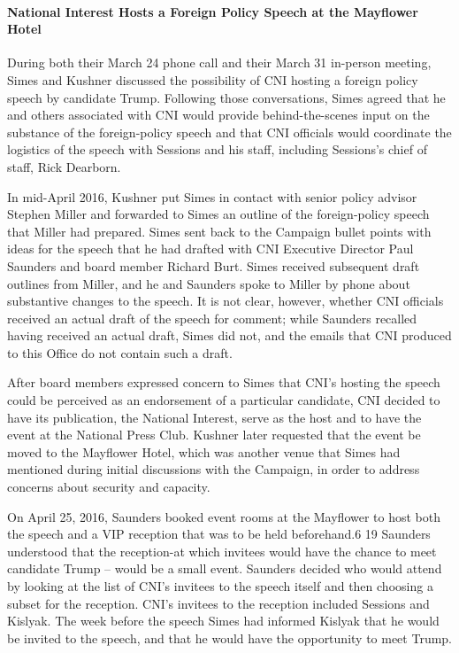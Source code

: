 \paragraph{National Interest Hosts a Foreign Policy Speech at the Mayflower Hotel}

During both their March 24 phone call and their March 31 in-person meeting, Simes and Kushner discussed the possibility of CNI hosting a foreign policy speech by candidate Trump.%
Following those conversations, Simes agreed that he and others associated with CNI would provide behind-the-scenes input on the substance of the foreign-policy speech and that CNI officials would coordinate the logistics of the speech with Sessions and his staff, including Sessions's chief of staff, Rick Dearborn.%

In mid-April 2016, Kushner put Simes in contact with senior policy advisor Stephen Miller and forwarded to Simes an outline of the foreign-policy speech that Miller had prepared.%
Simes sent back to the Campaign bullet points with ideas for the speech that he had drafted with CNI Executive Director Paul Saunders and board member Richard Burt.%
Simes received subsequent draft outlines from Miller, and he and Saunders spoke to Miller by phone about substantive changes to the speech.%
It is not clear, however, whether CNI officials received an actual draft of the speech for comment; while Saunders recalled having received an actual draft, Simes did not, and the emails that CNI produced to this Office do not contain such a draft.%

After board members expressed concern to Simes that CNI's hosting the speech could be perceived as an endorsement of a particular candidate, CNI decided to have its publication, the National Interest, serve as the host and to have the event at the National Press Club.%
Kushner later requested that the event be moved to the Mayflower Hotel, which was another venue that Simes had mentioned during initial discussions with the Campaign, in order to address concerns about security and capacity.%

On April 25, 2016, Saunders booked event rooms at the Mayflower to host both the speech and a VIP reception that was to be held beforehand.6 19 Saunders understood that the reception-at which invitees would have the chance to meet candidate Trump -- would be a small event.%
Saunders decided who would attend by looking at the list of CNI's invitees to the speech itself and then choosing a subset for the reception.%
CNI's invitees to the reception included Sessions and Kislyak.%
The week before the speech Simes had informed Kislyak that he would be invited to the speech, and that he would have the opportunity to meet Trump.%

